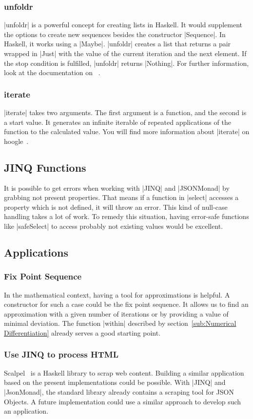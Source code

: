 \subsubsection{unfoldr}
\label{subsub:unfoldr}
|unfoldr| is a powerful concept for creating lists in Haskell. It would
supplement the options to create new sequences besides the constructor |Sequence|. 
In Haskell, it works using a |Maybe|. |unfoldr| creates a list that returns a
pair wrapped in |Just| with the value of the current iteration and the next
element. If the stop condition is fulfilled, |unfoldr| returns |Nothing|. For
further information, look at the documentation on ~\cite{hoogle_unfoldr}.

\subsubsection{iterate}
\label{subsub:iterate}
|iterate| takes two arguments. The first argument is a function, and the second
is a start value. It generates an infinite iterable of repeated applications of
the function to the calculated value. You will find more information about
|iterate| on hoogle~\cite{hoogle_iterate}.

\subsection{JINQ Functions}
\label{sub:JINQ Functions}
It is possible to get errors when working with |JINQ| and |JSONMonad| by grabbing
not present properties. That means if a function in |select| accesses a property
which is not defined, it will throw an error. This kind of null-case handling
takes a lot of work. To remedy this situation, having error-safe functions like
|safeSelect| to access probably not existing values would be excellent.

\subsection{Applications}
\label{sub:Applications}
\subsubsection{Fix Point Sequence}
\label{subsub:Fixpoint Sequence}
In the mathematical context, having a tool for approximations is helpful. A
constructor for such a case could be the fix point sequence. It allows us to
find an approximation with a given number of iterations or by providing a value
of minimal deviation. The function |within| described by
section~\ref{sub:Numerical Differentiation} already serves a good starting
point.

\subsubsection{Use JINQ to process HTML}
\label{subsub:Use JINQ to process HTML}
Scalpel~\cite{scalpel} is a Haskell library to scrap web content. Building a
similar application based on the present implementations could be possible.
With |JINQ| and |JsonMonad|, the standard library already contains a scraping
tool for JSON Objects. A future implementation could use a similar approach to
develop such an application.
